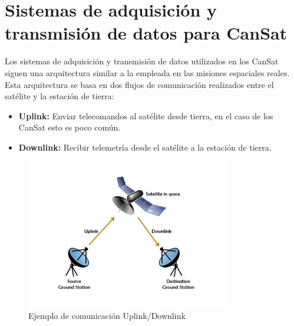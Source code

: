 \section{Sistemas de adquisición y transmisión de datos para CanSat}
Los sistemas de adquisición y transmisión de datos utilizados en los CanSat siguen una arquitectura similar a la empleada en las misiones espaciales reales.
Esta arquitectura se basa en dos flujos de comunicación realizados entre el satélite y la estación de tierra:
\begin{itemize}
    \item \textbf{Uplink:} Enviar telecomandos al satélite desde tierra, en el caso de los CanSat esto es poco común.
    \item \textbf{Downlink:} Recibir telemetría desde el satélite a la estación de tierra.
\end{itemize}

\begin{figure}
    \centering
    \includegraphics[width=0.8\textwidth]{Imagenes/Bitmap/upling_downlink}
    \caption{Ejemplo de comunicación Uplink/Downlink}
    \label{fig:uplink_downlink}
\end{figure}

